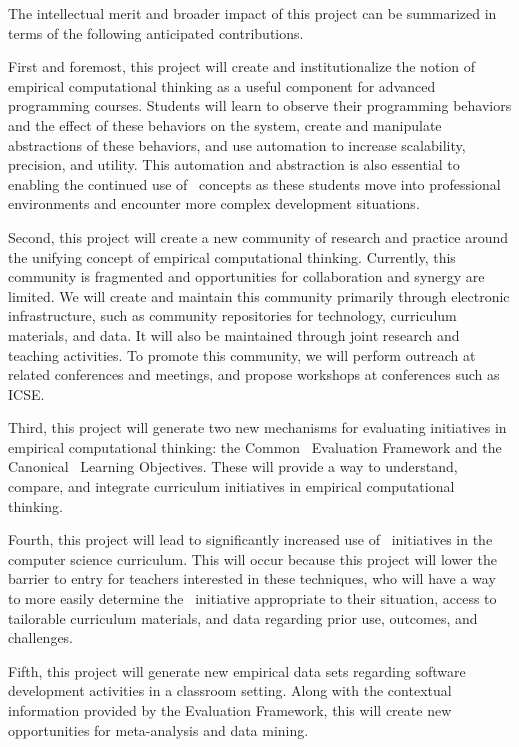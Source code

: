The intellectual merit and broader impact of this project can be summarized
in terms of the following anticipated contributions.

First and foremost, this project will create and institutionalize the
notion of empirical computational thinking as a useful component for
advanced programming courses.  Students will learn to observe their programming
behaviors and the effect of these behaviors on the system, create and
manipulate abstractions of these behaviors, and use automation to increase
scalability, precision, and utility.  This automation and abstraction is also
essential to enabling the continued use of \eCT\ concepts as these students
move into professional environments and encounter more complex development
situations.

Second, this project will create a new community of research and practice
around the unifying concept of empirical computational thinking.
Currently, this community is fragmented and opportunities for collaboration
and synergy are limited.  We will create and maintain this community
primarily through electronic infrastructure, such as community repositories
for technology, curriculum materials, and data.  It will also be maintained
through joint research and teaching activities.  To promote this community,
we will perform outreach at related conferences and meetings, and propose
workshops at conferences such as ICSE.

Third, this project will generate two new mechanisms for evaluating
initiatives in empirical computational thinking: the Common \eCT\
Evaluation Framework and the Canonical \eCT\ Learning Objectives.  These
will provide a way to understand, compare, and integrate curriculum
initiatives in empirical computational thinking.

Fourth, this project will lead to significantly increased use of \eCT\
initiatives in the computer science curriculum.  This will occur because this
project will lower the barrier to entry for teachers interested in
these techniques, who will have a way to more easily determine the \eCT\
initiative appropriate to their situation, access to tailorable curriculum
materials, and data regarding prior use, outcomes, and challenges.

Fifth, this project will generate new empirical data sets regarding
software development activities in a classroom setting.  Along with the
contextual information provided by the Evaluation Framework, this will
create new opportunities for meta-analysis and data mining.  

